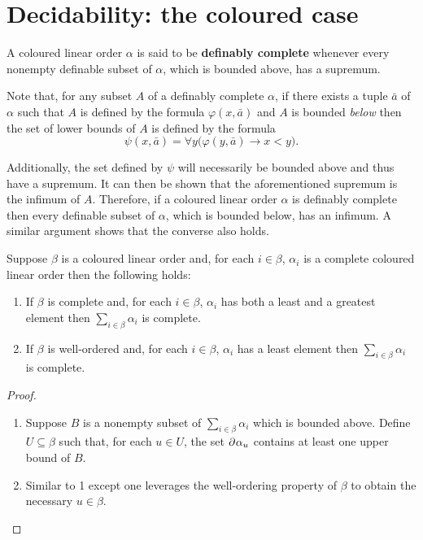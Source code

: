 \section{Decidability: the coloured case}

\begin{dfn}
	A coloured linear order $\alpha$ is said to be \textbf{definably complete} whenever every nonempty definable subset of $\alpha$, which is bounded above, has a supremum.
\end{dfn}

Note that, for any subset $A$ of a definably complete $\alpha$, if there exists a tuple $\bar{a}$ of $\alpha$ such that $A$ is defined by the formula $\varphi(x,\bar{a})$ and $A$ is bounded \textit{below} then the set of lower bounds of $A$ is defined by the formula
\begin{equation}
	\psi(x,\bar{a})=\forall y\big(\varphi(y,\bar{a})\rightarrow x<y\big).
\end{equation}

Additionally, the set defined by $\psi$ will necessarily be bounded above and thus have a supremum.  It can then be shown that the aforementioned supremum is the infimum of $A$.  Therefore, if a coloured linear order $\alpha$ is definably complete then every definable subset of $\alpha$, which is bounded below, has an infimum.  A similar argument shows that the converse also holds.

\begin{lem}\label{lem:compsum}
	Suppose $\beta$ is a coloured linear order and, for each $i\in\beta$, $\alpha_i$ is a complete coloured linear order then the following holds:
	\begin{enumerate}
		\item	If $\beta$ is complete and, for each $i\in\beta$, $\alpha_i$ has both a least and a greatest element then $\sum_{i\in\beta}\alpha_i$ is complete.
		\item	If $\beta$ is well-ordered and, for each $i\in\beta$, $\alpha_i$ has a least element then $\sum_{i\in\beta}\alpha_i$ is complete.
	\end{enumerate}
\end{lem}
\begin{proof}
	\begin{enumerate}[nosep]
		\item	Suppose $B$ is a nonempty subset of $\sum_{i\in\beta}\alpha_i$
		      which is bounded above.  Define $U\subseteq\beta$ such that, for each $u\in U$,
		      the set $\partial^{}{}{\alpha_{u}}$ contains at least one upper bound of $B$.
		\item	Similar to 1 except one leverages the well-ordering property of $\beta$ to obtain the necessary $u\in\beta$.\qedhere
	\end{enumerate}
\end{proof}

